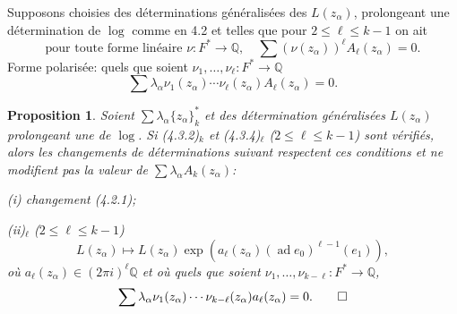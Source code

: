 \documentclass[12pt,a4paper]{article}
\theoremstyle{plain}
\newtheorem{proposition}{Proposition}[section]
\theoremstyle{definition}
\theoremstyle{remark}
\DeclareMathOperator{\ad}{ad}
\newcommand{\Q}{\mathbb{Q}}
\begin{document}
Supposons choisies des d\'eterminations g\'en\'eralis\'ees des $L(z_\alpha)$, prolongeant une d\'etermination de $\log$ comme en 4.2 et telles que pour $2\leq\ell\leq k-1$ on ait
\begin{equation}\label{eq:4.3.4}
\text{pour toute forme lin\'eaire }\nu:F^*\to\Q,\quad\sum(\nu(z_\alpha))^\ell A_\ell(z_\alpha)=0.\tag{4.3.4}
\end{equation}
Forme polaris\'ee: quels que soient $\nu_1,\ldots,\nu_\ell:F^*\to\Q$
\begin{equation}\label{eq:4.3.5}
\sum\lambda_\alpha\nu_1(z_\alpha)\cdots\nu_\ell(z_\alpha)A_\ell(z_\alpha)=0.\tag{4.3.5}
\end{equation}

\begin{proposition}
Soient $\sum\lambda_\alpha\{z_\alpha\}_k^*$ et des d\'etermination g\'en\'eralis\'ees $L(z_\alpha)$ prolongeant une de $\log$. Si (4.3.2)$_k$ et (4.3.4)$_\ell$ ($2\leq\ell\leq k-1$) sont v\'erifi\'es, alors les changements de d\'eterminations suivant respectent ces conditions et ne modifient pas la valeur de $\sum\lambda_\alpha A_k(z_\alpha)$:

\textup{(i)} changement (4.2.1);

\textup{(ii)}$_\ell$ ($2\leq\ell\leq k-1$)
\begin{equation*}
L(z_\alpha) \longmapsto L(z_\alpha)\exp(a_\ell(z_\alpha)(\ad e_0)^{\ell-1}(e_1)),
\end{equation*}
o\`u $a_\ell(z_\alpha)\in(2\pi i)^\ell\Q$ et o\`u quels que soient $\nu_1,\ldots,\nu_{k-\ell}:F^*\to\Q$,
\begin{equation*}
\sum\lambda_\alpha\nu_1(z_\alpha)\cdots\nu_{k-\ell}(z_\alpha)a_\ell(z_\alpha)=0.\qedhere
\end{equation*}
\end{proposition}
\end{document}

